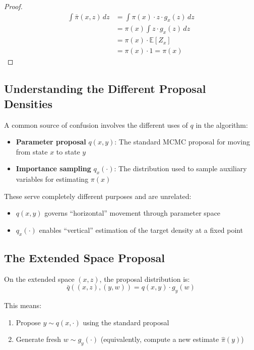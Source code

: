 \documentclass[11pt]{article}
\theoremstyle{definition}
\begin{document}
\begin{proof}
\begin{align}
\int \bar{\pi}(x,z) \, dz &= \int \pi(x) \cdot z \cdot g_x(z) \, dz\\
&= \pi(x) \int z \cdot g_x(z) \, dz\\
&= \pi(x) \cdot \mathbb{E}[Z_x]\\
&= \pi(x) \cdot 1 = \pi(x)
\end{align}
\end{proof}

\subsection{Understanding the Different Proposal Densities}

A common source of confusion involves the different uses of $q$ in the algorithm:

\begin{itemize}
\item \textbf{Parameter proposal} $q(x,y)$: The standard MCMC proposal for moving from state $x$ to state $y$
\item \textbf{Importance sampling} $q_x(\cdot)$: The distribution used to sample auxiliary variables for estimating $\pi(x)$
\end{itemize}

These serve completely different purposes and are unrelated:
\begin{itemize}
\item $q(x,y)$ governs ``horizontal'' movement through parameter space
\item $q_x(\cdot)$ enables ``vertical'' estimation of the target density at a fixed point
\end{itemize}

\subsection{The Extended Space Proposal}

On the extended space $(x,z)$, the proposal distribution is:
\begin{equation}
\bar{q}((x,z),(y,w)) = q(x,y) \cdot g_y(w)
\end{equation}

This means:
\begin{enumerate}
\item Propose $y \sim q(x,\cdot)$ using the standard proposal
\item Generate fresh $w \sim g_y(\cdot)$ (equivalently, compute a new estimate $\hat{\pi}(y)$)
\end{enumerate}
\end{document}
